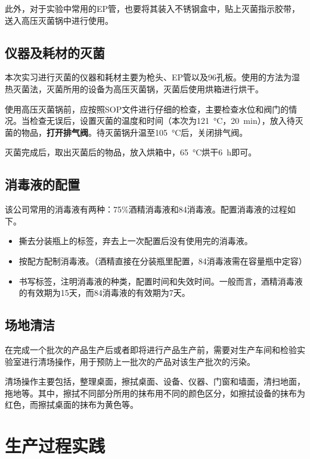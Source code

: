 \documentclass[cn,black,12pt,normal]{elegantnote}
\begin{document}
此外，对于实验中常用的EP管，也要将其装入不锈钢盒中，贴上灭菌指示胶带，送入高压灭菌锅中进行使用。

\subsection{仪器及耗材的灭菌}

本次实习进行灭菌的仪器和耗材主要为枪头、EP管以及96孔板。使用的方法为湿热灭菌法，灭菌所用的设备为高压灭菌锅，灭菌后使用烘箱进行烘干。

使用高压灭菌锅前，应按照SOP文件进行仔细的检查，主要检查水位和阀门的情况。当检查无误后，设置灭菌的温度和时间（本次为\SI{121}{\celsius}，\SI{20}{\minute}），放入待灭菌的物品，\textbf{打开排气阀}。待灭菌锅升温至\SI{105}{\celsius}后，关闭排气阀。

灭菌完成后，取出灭菌后的物品，放入烘箱中，\SI{65}{\celsius}烘干\SI{6}{\hour}即可。

\subsection{消毒液的配置}

该公司常用的消毒液有两种：75\%酒精消毒液和84消毒液。配置消毒液的过程如下。

\begin{itemize}
    \item 撕去分装瓶上的标签，弃去上一次配置后没有使用完的消毒液。
    \item 按配方配制消毒液。（酒精直接在分装瓶里配置，84消毒液需在容量瓶中定容）
    \item 书写标签，注明消毒液的种类，配置时间和失效时间。一般而言，酒精消毒液的有效期为15天，而84消毒液的有效期为7天。
\end{itemize}

\subsection{场地清洁}

在完成一个批次的产品生产后或者即将进行产品生产前，需要对生产车间和检验实验室进行清场操作，用于预防上一批次的产品对该生产批次的污染。

清场操作主要包括，整理桌面，擦拭桌面、设备、仪器、门窗和墙面，清扫地面，拖地等。其中，擦拭不同部分所用的抹布用不同的颜色区分，如擦拭设备的抹布为红色，而擦拭桌面的抹布为黄色等。


\section{生产过程实践}
\end{document}
